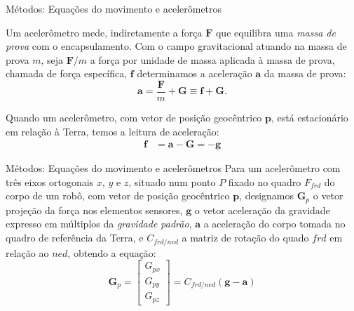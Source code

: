 \documentclass{beamer}
\begin{document}
\begin{frame}{Métodos: Equações do movimento e acelerômetros}

Um acelerômetro mede, indiretamente a força \(\mathbf{F}\) que equilibra uma \emph{massa de prova} com o encapsulamento. Com o campo gravitacional atuando na massa de prova \(m\), seja \(\mathbf{F}/m\) a força por unidade de massa aplicada à massa de prova, chamada de força específica, \(\mathbf{f}\) determinamos a aceleração \(\mathbf{a}\) da massa de prova:
\begin{equation*}
    \mathbf{a} = \dfrac{\mathbf{F}}{m} + \mathbf{G} \equiv \mathbf{f} + \mathbf{G}.
\end{equation*}

Quando um acelerômetro, com vetor de posição geocêntrico\footnotemark{} \(\mathbf{p}\), está estacionário em relação à Terra, temos a leitura de aceleração:
\begin{align}
    \mathbf{f} &= \mathbf{a} - \mathbf{G} = -\!{\mathbf{g}} \label{eq:1.6-29}
\end{align}
\end{frame}

\begin{frame}{Métodos: Equações do movimento e acelerômetros}
Para um acelerômetro com três eixos ortogonais \(x\), \(y\) e \(z\), situado num ponto \({P}\) fixado no quadro \({F}_{frd}\) do corpo de um robô, com vetor de posição geocêntrico \(\mathbf{p}\), designamos \(\mathbf{G}_{p}\) o vetor projeção da força nos elementos sensores, \(\mathbf{g}\) o vetor aceleração da gravidade expresso em múltiplos da \emph{gravidade padrão}, \(\mathbf{a}\) a aceleração do corpo tomada no quadro de referência da Terra, e \({C}_{frd/ned}\) a matriz de rotação do quado \(frd\) em relação ao \(ned\), obtendo a equação:
\begin{equation*}
    {\mathbf{G}}_p = \begin{bmatrix} {G}_{px} \\ {G}_{py} \\ {G}_{pz} \end{bmatrix} = {C}_{frd/ned}\left(\mathbf{g} - {\mathbf{a}}\right)
\end{equation*}
\end{frame}
\end{document}
